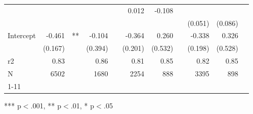 \documentclass{article}
\begin{document}
\begin{table}[!h]
\begin{tabular}{lllllllllll}
  \multicolumn{1}{r}{} &
  \multicolumn{1}{l}{} &
  \multicolumn{1}{r}{} &
  \multicolumn{1}{r}{} &
  \multicolumn{1}{l}{} &
  \multicolumn{1}{r}{0.012} &
  \multicolumn{1}{r}{-0.108} &
  \multicolumn{1}{l}{} \\
\multicolumn{1}{l}{} &
  \multicolumn{1}{r}{} &
  \multicolumn{1}{l}{} &
  \multicolumn{1}{r}{} &
  \multicolumn{1}{l}{} &
  \multicolumn{1}{r}{} &
  \multicolumn{1}{r}{} &
  \multicolumn{1}{l}{} &
  \multicolumn{1}{r}{(0.051)} &
  \multicolumn{1}{r}{(0.086)} &
  \multicolumn{1}{l}{} \\
\multicolumn{1}{l}{Intercept} &
  \multicolumn{1}{r}{-0.461} &
  \multicolumn{1}{l}{**} &
  \multicolumn{1}{r}{-0.104} &
  \multicolumn{1}{l}{} &
  \multicolumn{1}{r}{-0.364} &
  \multicolumn{1}{r}{0.260} &
  \multicolumn{1}{l}{} &
  \multicolumn{1}{r}{-0.338} &
  \multicolumn{1}{r}{0.326} &
  \multicolumn{1}{l}{} \\
\multicolumn{1}{l}{} &
  \multicolumn{1}{r}{(0.167)} &
  \multicolumn{1}{l}{} &
  \multicolumn{1}{r}{(0.394)} &
  \multicolumn{1}{l}{} &
  \multicolumn{1}{r}{(0.201)} &
  \multicolumn{1}{r}{(0.532)} &
  \multicolumn{1}{l}{} &
  \multicolumn{1}{r}{(0.198)} &
  \multicolumn{1}{r}{(0.528)} &
  \multicolumn{1}{l}{} \\
\multicolumn{1}{l}{r2} &
  \multicolumn{1}{r}{0.83} &
  \multicolumn{1}{l}{} &
  \multicolumn{1}{r}{0.86} &
  \multicolumn{1}{l}{} &
  \multicolumn{1}{r}{0.81} &
  \multicolumn{1}{r}{0.85} &
  \multicolumn{1}{l}{} &
  \multicolumn{1}{r}{0.82} &
  \multicolumn{1}{r}{0.85} &
  \multicolumn{1}{l}{} \\
\multicolumn{1}{l}{N} &
  \multicolumn{1}{r}{6502} &
  \multicolumn{1}{l}{} &
  \multicolumn{1}{r}{1680} &
  \multicolumn{1}{l}{} &
  \multicolumn{1}{r}{2254} &
  \multicolumn{1}{r}{888} &
  \multicolumn{1}{l}{} &
  \multicolumn{1}{r}{3395} &
  \multicolumn{1}{r}{898} &
  \multicolumn{1}{l}{} \\
\cline{1-11}
\end{tabular}

\footnotesize{
*** p$<$.001, ** p$<$.01, * p$<$.05
}
\end{table}
\end{document}
